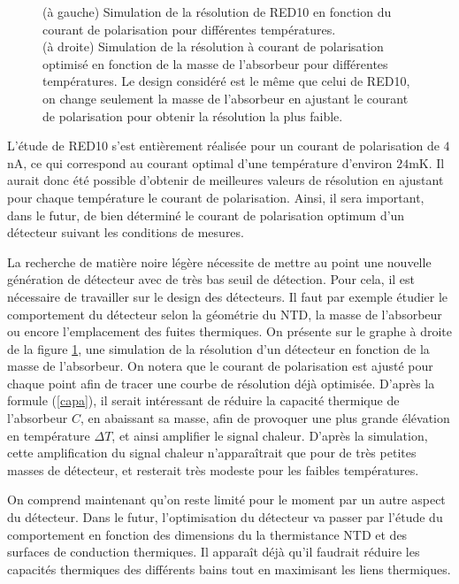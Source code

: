 \begin{figure}[!ht]
\begin{minipage}{0.49\textwidth}
\end{minipage}
\caption{(à gauche) Simulation de la résolution de RED10 en fonction du courant de polarisation pour différentes températures. \\ (à droite) Simulation de la résolution à courant de polarisation optimisé en fonction de la masse de l'absorbeur pour différentes températures. Le design considéré est le même que celui de RED10, on change seulement la masse de l'absorbeur en ajustant le courant de polarisation pour obtenir la résolution la plus faible.}
\label{optim}
\end{figure}

L'étude de RED10 s'est entièrement réalisée pour un courant de polarisation de $4$nA, ce qui correspond au courant optimal d'une température d'environ $24$mK. Il aurait donc été possible d'obtenir de meilleures valeurs de résolution en ajustant pour chaque température le courant de polarisation. Ainsi, il sera important, dans le futur, de bien déterminé le courant de polarisation optimum d'un détecteur suivant les conditions de mesures.

La recherche de matière noire légère nécessite de mettre au point une nouvelle génération de détecteur avec de très bas seuil de détection. Pour cela, il est nécessaire de travailler sur le design des détecteurs. Il faut par exemple étudier le comportement du détecteur selon la géométrie du NTD, la masse de l'absorbeur ou encore l'emplacement des fuites thermiques. On présente sur le graphe à droite de la figure \ref{optim}, une simulation de la résolution d'un détecteur en fonction de la masse de l'absorbeur. On notera que le courant de polarisation est ajusté pour chaque point afin de tracer une courbe de résolution déjà optimisée. D'après la formule (\ref{capa}), il serait intéressant de réduire la capacité thermique de l'absorbeur $C$, en abaissant sa masse, afin de provoquer une plus grande élévation en température $\Delta T$, et ainsi amplifier le signal chaleur. D'après la simulation, cette amplification du signal chaleur n'apparaîtrait que pour de très petites masses de détecteur, et resterait très modeste pour les faibles températures. 

On comprend maintenant qu'on reste limité pour le moment par un autre aspect du détecteur. Dans le futur, l'optimisation du détecteur va passer par l'étude du comportement en fonction des dimensions du la thermistance NTD et des surfaces de conduction thermiques. Il apparaît déjà qu'il faudrait réduire les capacités thermiques des différents bains tout en maximisant les liens thermiques. 

